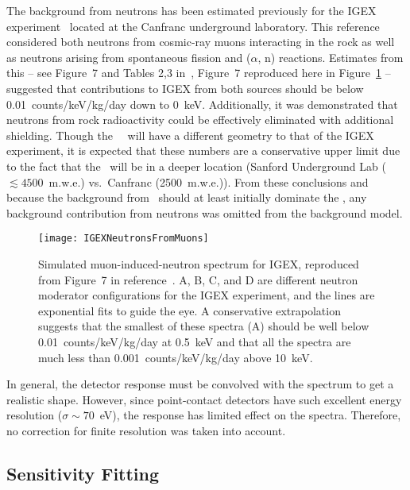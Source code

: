 	The background from neutrons has been estimated previously for the IGEX experiment~\cite{Carmona2004523} located at the Canfranc underground laboratory.  This reference considered both neutrons from cosmic-ray muons interacting in the rock as well as neutrons arising from spontaneous fission and ($\alpha$, n) reactions.  Estimates from this -- see Figure~7 and Tables 2,3 in~\cite{Carmona2004523}, Figure~7 reproduced here in Figure~\ref{fig:IGEXNeutrons} -- suggested that contributions to IGEX from both sources should be below 0.01~counts/keV/kg/day down to 0~keV.  Additionally, it was demonstrated that neutrons from rock radioactivity could be effectively eliminated with additional shielding.  Though the \MJ~\minmod~will have a different geometry to that of the IGEX experiment, it is expected that these numbers are a conservative upper limit due to the fact that the \minmod~will be in a deeper location (Sanford Underground Lab ($\lesssim4500$~m.w.e.) vs.~Canfranc (2500~m.w.e.)).  From these conclusions and because the background from \hthree~should at least initially dominate the \minmod, any background contribution from neutrons was omitted from the background model.
	
			\begin{figure}
				\centering
				\texttt{[image: IGEXNeutronsFromMuons]}
				\caption[Simulated muon-induced-neutron spectrum for IGEX]{Simulated muon-induced-neutron 
				spectrum for IGEX, reproduced from Figure~7 in reference~\cite{Carmona2004523}.  A, B, C, and D are different
				neutron moderator configurations for the IGEX experiment, and the lines are exponential fits to guide the eye.
				A conservative extrapolation suggests that the smallest of these spectra (A) 
				should be well below 0.01~counts/keV/kg/day at
				0.5~keV and that all the spectra are much less than 0.001~counts/keV/kg/day above 10~keV.}
				\label{fig:IGEXNeutrons}
			\end{figure}
	
	In general, the detector response must be convolved with the spectrum to get a realistic shape.  However, since point-contact detectors have such excellent energy resolution ($\sigma\sim70$~eV), the response has limited effect on the spectra.  Therefore, no correction for finite resolution was taken into account.  

		\subsection{Sensitivity Fitting}
		\label{sec:MJSensitivityFitting}
	
